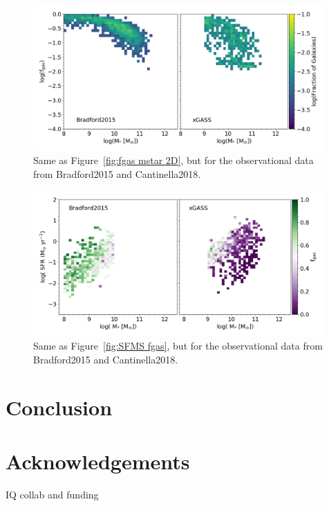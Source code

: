 \documentclass[fleqn,usenatbib]{mnras}
\begin{document}
\begin{figure}
\includegraphics[width = 0.99\textwidth]{fgas_mstar_2D_log_fgas_obs.png}
\caption{Same as Figure~\ref{fig:fgas mstar 2D}, but for the observational data from Bradford2015 and Cantinella2018.}
\label{fig:fgas mstar 2D obs}
\end{figure}

\begin{figure}
\includegraphics[width = 0.99\textwidth]{SFMS_fits_2dhist_median_obs.png}
\caption{Same as Figure~\ref{fig:SFMS fgas}, but for the observational data from Bradford2015 and Cantinella2018.}
\label{fig:SFMS mstar 2D obs}
\end{figure}

\section{Conclusion}


\section*{Acknowledgements}
IQ collab and funding


\end{document}
